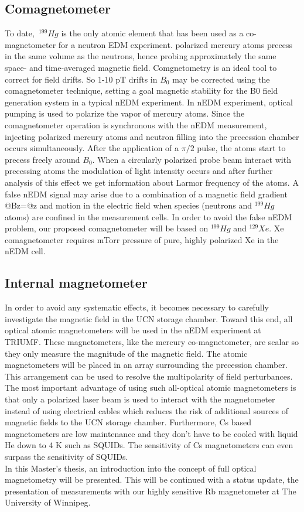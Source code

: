 \subsection{Comagnetometer}
To date,~$^{199}Hg$ is the only atomic element that has been used as a co-magnetometer for a neutron EDM experiment\cite{PhysRevLett.97.131801}\cite{PhysRevLett.102.101601}.  polarized mercury atoms precess in the same volume as the neutrons, hence probing approximately the same space- and time-averaged magnetic field.  Comgnetometry is an ideal tool to correct for field drifts.  So 1-10 pT drifts in $B_0$  may be corrected using the comagnetometer technique, setting a goal magnetic stability for the B0  field generation system in a typical nEDM experiment\cite{PhysRevLett.97.131801}\cite{afach:in2p3-01062292}. In nEDM experiment, optical pumping is used to polarize the vapor of mercury atoms. Since the comagnetometer operation is synchronous with the nEDM measurement, injecting polarized mercury atoms and  neutron filling into the precession chamber occurs simultaneously. After the application of a $\pi/2$ pulse, the atoms start to precess freely around $B_0$. When a circularly polarized probe beam interact with precessing atoms the modulation of light intensity occurs and after further analysis of  this effect we get information about Larmor frequency of the atoms. A false nEDM signal may arise due to a combination of a magnetic field gradient @Bz=@z and motion in the electric field when species (neutrons and $^{199}Hg$ atoms) are confined in the measurement cells. In order to avoid the false nEDM problem, our proposed comagnetometer will be based on $^{199}Hg$ and $^{129}Xe$. Xe comagnetometer requires mTorr pressure of pure,
highly polarized Xe in the nEDM cell.
\subsection{Internal magnetometer}

In order to avoid any systematic effects, it becomes necessary to carefully investigate the magnetic field in the UCN storage chamber.  Toward this end, all optical atomic magnetometers will be used in the nEDM experiment at TRIUMF.  These magnetometers, like the mercury co-magnetometer, are scalar so they only measure the magnitude of the magnetic field.  The atomic  magnetometers will be placed in an array surrounding the precession chamber. This arrangement can be used to resolve the multipolarity of field perturbances. The most important advantage of using such all-optical atomic magnetometers is that only a polarized laser beam is used to interact with the magnetometer instead of using electrical cables which reduces the risk of additional sources of magnetic fields to the UCN storage chamber. Furthermore, Cs based magnetometers are low  maintenance and they don't have to be cooled with liquid He down to 4 K such as SQUIDs.  The sensitivity of Cs magnetometers can even surpass the sensitivity of SQUIDs. \\
In this Master's thesis, an introduction into the concept of full optical magnetometry will be presented. This will be continued with a status update, the presentation of measurements with our highly sensitive Rb magnetometer at The University of Winnipeg. 

